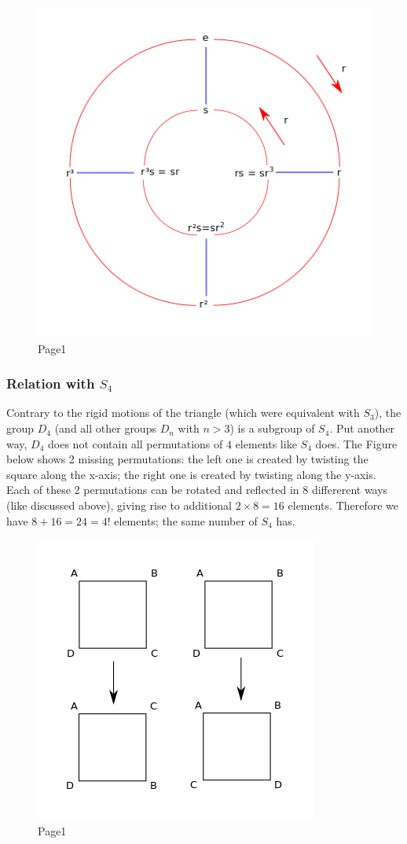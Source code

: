 \begin{figure}[H]
\centering
\includegraphics[scale=0.7]{images/groups_04_5.png}
\caption{Page1}
\end{figure}

\subsubsection{\texorpdfstring{Relation with
\(S_4\)}{Relation with S\_4}}\label{relation-with-s_4}

Contrary to the rigid motions of the triangle (which were equivalent
with \(S_3\)), the group \(D_4\) (and all other groups \(D_n\) with
\(n > 3\)) is a subgroup of \(S_4\). Put another way, \(D_4\) does not
contain all permutations of \(4\) elements like \(S_4\) does. The Figure
below shows 2 missing permutations: the left one is created by twisting
the square along the x-axis; the right one is created by twisting along
the y-axis. Each of these 2 permutations can be rotated and reflected in
8 differerent ways (like discussed above), giving rise to additional
\(2 \times 8 = 16\) elements. Therefore we have \(8 + 16 = 24 = 4!\)
elements; the same number of \(S_4\) has.

\begin{figure}[H]
\centering
\includegraphics[scale=0.7]{images/groups_04_6.png}
\caption{Page1}
\end{figure}
